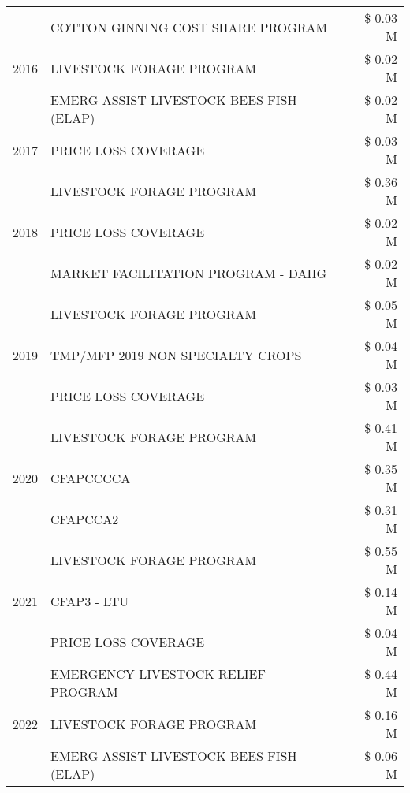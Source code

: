 \begin{tabular}{llr}
\cline{1-3}
\multirow[t]{3}{*}{2016} & COTTON GINNING COST SHARE PROGRAM & \$ 0.03 M \\
 & LIVESTOCK FORAGE PROGRAM & \$ 0.02 M \\
 & EMERG ASSIST LIVESTOCK BEES FISH (ELAP) & \$ 0.02 M \\
\cline{1-3}
2017 & PRICE LOSS COVERAGE & \$ 0.03 M \\
\cline{1-3}
\multirow[t]{3}{*}{2018} & LIVESTOCK FORAGE PROGRAM & \$ 0.36 M \\
 & PRICE LOSS COVERAGE & \$ 0.02 M \\
 & MARKET FACILITATION PROGRAM - DAHG & \$ 0.02 M \\
\cline{1-3}
\multirow[t]{3}{*}{2019} & LIVESTOCK FORAGE PROGRAM & \$ 0.05 M \\
 & TMP/MFP 2019 NON SPECIALTY CROPS & \$ 0.04 M \\
 & PRICE LOSS COVERAGE & \$ 0.03 M \\
\cline{1-3}
\multirow[t]{3}{*}{2020} & LIVESTOCK FORAGE PROGRAM & \$ 0.41 M \\
 & CFAPCCCCA & \$ 0.35 M \\
 & CFAPCCA2 & \$ 0.31 M \\
\cline{1-3}
\multirow[t]{3}{*}{2021} & LIVESTOCK FORAGE PROGRAM & \$ 0.55 M \\
 & CFAP3 - LTU & \$ 0.14 M \\
 & PRICE LOSS COVERAGE & \$ 0.04 M \\
\cline{1-3}
\multirow[t]{3}{*}{2022} & EMERGENCY LIVESTOCK RELIEF PROGRAM & \$ 0.44 M \\
 & LIVESTOCK FORAGE PROGRAM & \$ 0.16 M \\
 & EMERG ASSIST LIVESTOCK BEES FISH (ELAP) & \$ 0.06 M \\
\cline{1-3}
\bottomrule
\end{tabular}
